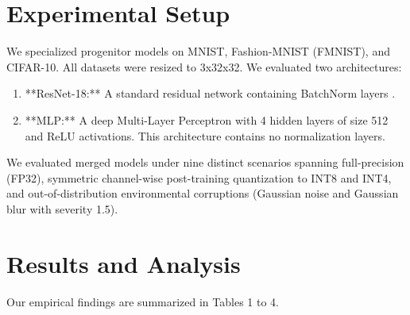 \documentclass{article}
\theoremstyle{plain}
\theoremstyle{definition}
\theoremstyle{remark}
\begin{document}
\section{Experimental Setup}
We specialized progenitor models on MNIST, Fashion-MNIST (FMNIST), and CIFAR-10. All datasets were resized to 3x32x32. We evaluated two architectures:
\begin{enumerate}
    \item **ResNet-18:** A standard residual network \cite{he2016deep} containing BatchNorm layers \cite{ioffe2015batch}.
    \item **MLP:** A deep Multi-Layer Perceptron with 4 hidden layers of size 512 and ReLU activations. This architecture contains no normalization layers.
\end{enumerate}

We evaluated merged models under nine distinct scenarios spanning full-precision (FP32), symmetric channel-wise post-training quantization to INT8 and INT4, and out-of-distribution environmental corruptions (Gaussian noise and Gaussian blur with severity 1.5).

\section{Results and Analysis}

Our empirical findings are summarized in Tables 1 to 4.
\end{document}
